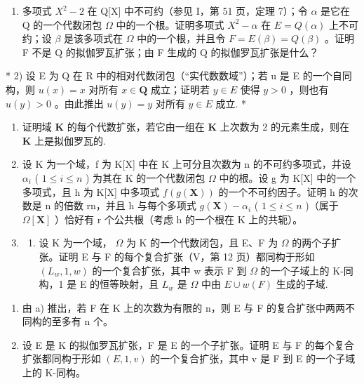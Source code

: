 \BourbakiExerciseGroup

\begin{enumerate}
\def\labelenumi{\arabic{enumi})}
\tightlist
\item
  多项式 \(X^{2}-2\) 在 Q{[}X{]} 中不可约（参见 I，第 51 页，定理 7）；令 \(\alpha\) 是它在 Q 的一个代数闭包 \(\Omega\) 中的一个根。证明多项式 \(X^{2}-\alpha\) 在 \(E = Q(\alpha)\) 上不可约；设 \(\beta\) 是该多项式在 \(\Omega\) 中的一个根，并且令 \(F = E(\beta) = Q(\beta)\) 。证明 F 不是 Q 的拟伽罗瓦扩张；由 F 生成的 Q 的拟伽罗瓦扩张是什么？
\end{enumerate}

* 2) 设 E 为 Q 在 R 中的相对代数闭包（“实代数数域”）；若 u 是 E 的一个自同构，则 \(u(x) = x\) 对所有 \(x \in \mathbf{Q}\) 成立；证明若 \(y \in E\) 使得 \(y > 0\) ，则也有 \(u(y) > 0\) 。由此推出 \(u(y) = y\) 对所有 \(y \in E\) 成立. *

\begin{enumerate}
\def\labelenumi{\arabic{enumi})}
\setcounter{enumi}{2}
\item
  证明域 \(\mathbf{K}\) 的每个代数扩张，若它由一组在 \(\mathbf{K}\) 上次数为 2 的元素生成，则在 \(\mathbf{K}\) 上是拟伽罗瓦的.
\item
  设 K 为一个域，f 为 K{[}X{]} 中在 K 上可分且次数为 n 的不可约多项式，并设 \(\alpha_{i}\) ( \(1 \leqslant i \leqslant n\) ) 为其在 K 的一个代数闭包 \(\Omega\) 中的根。设 g 为 K{[}X{]} 中的一个多项式，且 h 为 K{[}X{]} 中多项式 \(f(g(\mathbf{X}))\) 的一个不可约因子。证明 h 的次数是 n 的倍数 rn，并且 h 与每个多项式 \(g(\mathbf{X}) - \alpha_{i}\) ( \(1 \leqslant i \leqslant n\) )（属于 \(\Omega[\mathbf{X}]\) ）恰好有 r 个公共根（考虑 h 的一个根在 K 上的共轭）。
\item
  \begin{enumerate}
  \def\labelenumii{\alph{enumii})}
  \tightlist
  \item
    设 K 为一个域， \(\Omega\) 为 K 的一个代数闭包，且 E、F 为 \(\Omega\) 的两个子扩张。证明 E 与 F 的每个复合扩张（V，第 12 页）都同构于形如 \((L_{w}, 1, w)\) 的一个复合扩张，其中 w 表示 F 到 \(\Omega\) 的一个子域上的 K-同构，1 是 E 的恒等映射，且 \(L_{w}\) 是 \(\Omega\) 中由 \(E \cup w(F)\) 生成的子域.
  \end{enumerate}
\end{enumerate}

\begin{enumerate}
\def\labelenumi{\alph{enumi})}
\setcounter{enumi}{1}
\item
  由 a) 推出，若 F 在 K 上的次数为有限的 n，则 E 与 F 的复合扩张中两两不同构的至多有 n 个。
\item
  设 E 是 K 的拟伽罗瓦扩张，F 是 E 的一个子扩张。证明 E 与 F 的每个复合扩张都同构于形如 \((E, 1, v)\) 的一个复合扩张，其中 v 是 F 到 E 的一个子域上的 K-同构。
\end{enumerate}

